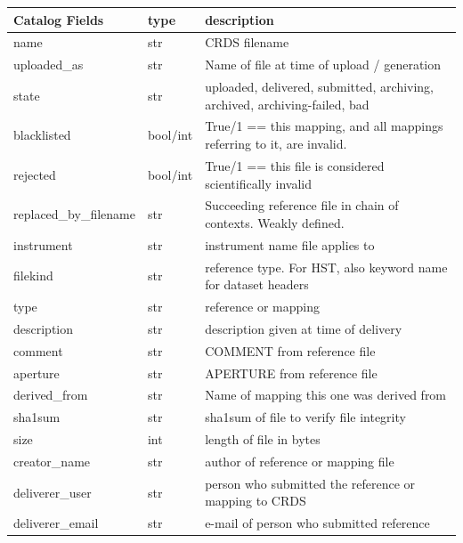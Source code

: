 \documentclass[letterpaper,10pt,english]{sphinxmanual}
\begin{document}
\begin{tabulary}{\linewidth}{|L|L|L|}
\hline
\textbf{
Catalog Fields
} & \textbf{
type
} & \textbf{
description
}\\\hline

name
 & 
str
 & 
CRDS filename
\\\hline

uploaded\_as
 & 
str
 & 
Name of file at time of upload / generation
\\\hline

state
 & 
str
 & 
uploaded, delivered, submitted, archiving, archived, archiving-failed, bad
\\\hline

blacklisted
 & 
bool/int
 & 
True/1 == this mapping,  and all mappings referring to it, are invalid.
\\\hline

rejected
 & 
bool/int
 & 
True/1 == this file is considered scientifically invalid
\\\hline

replaced\_by\_filename
 & 
str
 & 
Succeeding reference file in chain of contexts.  Weakly defined.
\\\hline

instrument
 & 
str
 & 
instrument name file applies to
\\\hline

filekind
 & 
str
 & 
reference type. For HST,  also keyword name for dataset headers
\\\hline

type
 & 
str
 & 
reference or mapping
\\\hline

description
 & 
str
 & 
description given at time of delivery
\\\hline

comment
 & 
str
 & 
COMMENT from reference file
\\\hline

aperture
 & 
str
 & 
APERTURE from reference file
\\\hline

derived\_from
 & 
str
 & 
Name of mapping this one was derived from
\\\hline

sha1sum
 & 
str
 & 
sha1sum of file to verify file integrity
\\\hline

size
 & 
int
 & 
length of file in bytes
\\\hline

creator\_name
 & 
str
 & 
author of reference or mapping file
\\\hline

deliverer\_user
 & 
str
 & 
person who submitted the reference or mapping to CRDS
\\\hline

deliverer\_email
 & 
str
 & 
e-mail of person who submitted reference
\\\hline
\end{tabulary}
\end{document}

